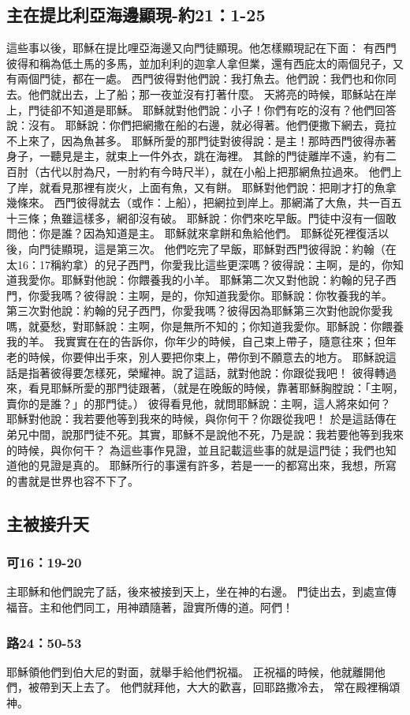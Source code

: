 \subsection{主在提比利亞海邊顯現-約21：1-25}
這些事以後，耶穌在提比哩亞海邊又向門徒顯現。他怎樣顯現記在下面：
有西門彼得和稱為低土馬的多馬，並加利利的迦拿人拿但業，還有西庇太的兩個兒子，又有兩個門徒，都在一處。
西門彼得對他們說：我打魚去。他們說：我們也和你同去。他們就出去，上了船；那一夜並沒有打著什麼。
天將亮的時候，耶穌站在岸上，門徒卻不知道是耶穌。
耶穌就對他們說：小子！你們有吃的沒有？他們回答說：沒有。
耶穌說：你們把網撒在船的右邊，就必得著。他們便撒下網去，竟拉不上來了，因為魚甚多。
耶穌所愛的那門徒對彼得說：是主！那時西門彼得赤著身子，一聽見是主，就束上一件外衣，跳在海裡。
其餘的門徒離岸不遠，約有二百肘（古代以肘為尺，一肘約有今時尺半），就在小船上把那網魚拉過來。
他們上了岸，就看見那裡有炭火，上面有魚，又有餅。
耶穌對他們說：把剛才打的魚拿幾條來。
西門彼得就去（或作：上船），把網拉到岸上。那網滿了大魚，共一百五十三條；魚雖這樣多，網卻沒有破。
耶穌說：你們來吃早飯。門徒中沒有一個敢問他：你是誰？因為知道是主。
耶穌就來拿餅和魚給他們。
耶穌從死裡復活以後，向門徒顯現，這是第三次。
他們吃完了早飯，耶穌對西門彼得說：約翰（在太16：17稱約拿）的兒子西門，你愛我比這些更深嗎？彼得說：主啊，是的，你知道我愛你。耶穌對他說：你餵養我的小羊。
耶穌第二次又對他說：約翰的兒子西門，你愛我嗎？彼得說：主啊，是的，你知道我愛你。耶穌說：你牧養我的羊。
第三次對他說：約翰的兒子西門，你愛我嗎？彼得因為耶穌第三次對他說你愛我嗎，就憂愁，對耶穌說：主啊，你是無所不知的；你知道我愛你。耶穌說：你餵養我的羊。
我實實在在的告訴你，你年少的時候，自己束上帶子，隨意往來；但年老的時候，你要伸出手來，別人要把你束上，帶你到不願意去的地方。
耶穌說這話是指著彼得要怎樣死，榮耀神。說了這話，就對他說：你跟從我吧！
彼得轉過來，看見耶穌所愛的那門徒跟著，（就是在晚飯的時候，靠著耶穌胸膛說：「主啊，賣你的是誰？」的那門徒。）
彼得看見他，就問耶穌說：主啊，這人將來如何？
耶穌對他說：我若要他等到我來的時候，與你何干？你跟從我吧！
於是這話傳在弟兄中間，說那門徒不死。其實，耶穌不是說他不死，乃是說：我若要他等到我來的時候，與你何干？
為這些事作見證，並且記載這些事的就是這門徒；我們也知道他的見證是真的。
耶穌所行的事還有許多，若是一一的都寫出來，我想，所寫的書就是世界也容不下了。

\subsection{主被接升天}
\subsubsection{可16：19-20}
主耶穌和他們說完了話，後來被接到天上，坐在神的右邊。
門徒出去，到處宣傳福音。主和他們同工，用神蹟隨著，證實所傳的道。阿們！

\subsubsection{路24：50-53}
耶穌領他們到伯大尼的對面，就舉手給他們祝福。
正祝福的時候，他就離開他們，被帶到天上去了。
他們就拜他，大大的歡喜，回耶路撒冷去，
常在殿裡稱頌神。